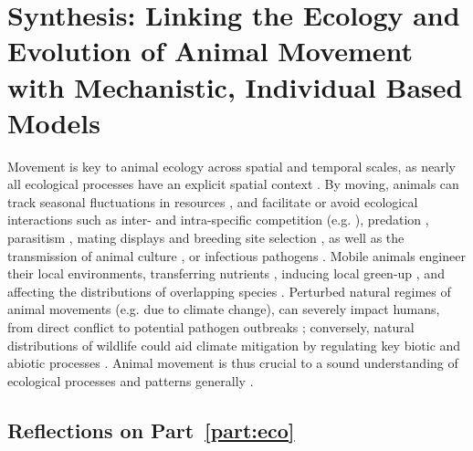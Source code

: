 
{}%
\chapter{Synthesis: Linking the Ecology and Evolution of Animal Movement with Mechanistic, Individual Based Models}\label{ch:discussion}

Movement is key to animal ecology across spatial and temporal scales, as nearly all ecological processes have an explicit spatial context \citep{nathan2008a}.
By moving, animals can track seasonal fluctuations in resources \citep{geremia2019,abrahms2021a}, and facilitate or avoid ecological interactions such as inter- and intra-specific competition (e.g. \cite{duckworth2007}), predation \citep[e.g.][]{kohl2018}, parasitism \citep{weinstein2018}, mating displays and breeding site selection \citep{kempenaers2017}, as well as the transmission of animal culture \citep{jesmer2018,klump2021}, or infectious pathogens \citep[][see also Chapter~\ref{ch:pathomove}]{weinstein2018,monk2022,stroeymeyt2018}.
Mobile animals engineer their local environments, transferring nutrients \citep{leroux2018}, inducing local green-up \citep{geremia2019}, and affecting the distributions of overlapping species \citep[see e.g.][]{kohl2018,leroux2018,duckworth2007,monk2022}.
Perturbed natural regimes of animal movements (e.g. due to climate change), can severely impact humans, from direct conflict \citep{abrahms2021} to potential pathogen outbreaks \citep{carlson2022a,wille2022}; conversely, natural distributions of wildlife could aid climate mitigation by regulating key biotic and abiotic processes \citep{schmitz2018,malhi2022}.
Animal movement is thus crucial to a sound understanding of ecological processes and patterns generally \citep{jeltsch2013,schlagel2020}.

\section*{Reflections on Part~\ref{part:eco}}

